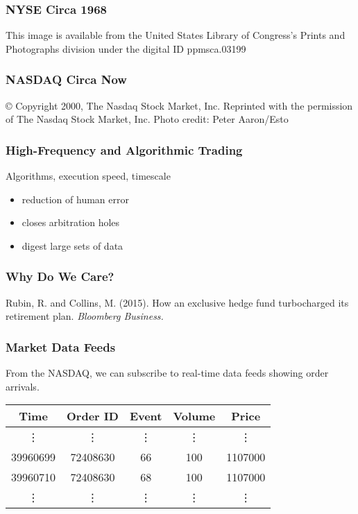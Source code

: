 \begin{frame}
\frametitle{NYSE Circa 1968}
{\tiny This image is available from the United States Library of Congress's Prints and Photographs division under the digital ID ppmsca.03199}
\end{frame}

\begin{frame}
\frametitle{NASDAQ Circa Now}
{\tiny © Copyright 2000, The Nasdaq Stock Market, Inc.
Reprinted with the permission of The Nasdaq Stock Market, Inc.
Photo credit: Peter Aaron/Esto }
\end{frame}
    
\begin{frame}
\frametitle{High-Frequency and Algorithmic Trading}
Algorithms, execution speed, timescale
\begin{itemize}
\item reduction of human error
\item closes arbitration holes
\item digest large sets of data
\end{itemize}
\end{frame}
    
\begin{frame}
\frametitle{Why Do We Care?}
{\tiny Rubin, R. and Collins, M. (2015). How an exclusive hedge fund turbocharged its retirement plan. \textit{Bloomberg Business.}}
\end{frame}

    
\begin{frame}[t]
\frametitle{Market Data Feeds}
From the NASDAQ, we can subscribe to real-time data feeds showing order arrivals.

\begin{center}
\begin{table}
\begin{tabular}{@{} *{5}{c} @{}}
\toprule
Time & Order ID & Event & Volume & Price \\
\midrule
\vdots & \vdots & \vdots & \vdots & \vdots \\
39960699 &72408630 & 66 & 100 & 1107000 \\
39960710 & 72408630 & 68 & 100 & 1107000 \\
\vdots & \vdots & \vdots & \vdots & \vdots \\
\bottomrule
\end{tabular}
\end{table}
\end{center}
\end{frame}
        
